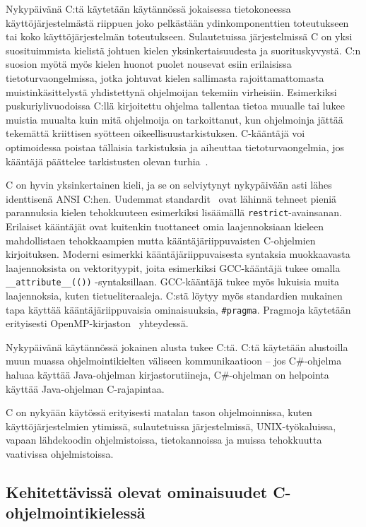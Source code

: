 \grayrule

Nykypäivänä C:tä käytetään käytännössä jokaisessa tietokoneessa
käyttöjärjestelmästä riippuen joko pelkästään ydinkomponenttien toteutukseen
tai koko käyttöjärjestelmän toteutukseen. Sulautetuissa järjestelmissä C on
yksi suosituimmista kielistä johtuen kielen yksinkertaisuudesta ja
suorituskyvystä. C:n suosion myötä myös kielen huonot puolet nousevat esiin
erilaisissa tietoturvaongelmissa, jotka johtuvat kielen sallimasta
rajoittamattomasta muistinkäsittelystä yhdistettynä ohjelmoijan tekemiin
virheisiin. Esimerkiksi puskuriylivuodoissa C:llä kirjoitettu ohjelma tallentaa
tietoa muualle tai lukee muistia muualta kuin mitä ohjelmoija on tarkoittanut,
kun ohjelmoinja jättää tekemättä kriittisen syötteen oikeellisuustarkistuksen.
C-kääntäjä voi optimoidessa poistaa tällaisia tarkistuksia ja aiheuttaa
tietoturvaongelmia, jos kääntäjä päättelee tarkistusten olevan
turhia~\citep{redhatsecurity}.

C on hyvin yksinkertainen kieli, ja se on selviytynyt nykypäivään asti lähes
identtisenä ANSI C:hen. Uudemmat standardit~\citep{C99, C11, C18} ovat lähinnä
tehneet pieniä parannuksia kielen tehokkuuteen esimerkiksi lisäämällä
\texttt{restrict}-avainsanan. Erilaiset kääntäjät ovat kuitenkin tuottaneet
omia laajennoksiaan kieleen mahdollistaen tehokkaampien mutta
kääntäjäriippuvaisten C-ohjelmien kirjoituksen. Moderni esimerkki
kääntäjäriippuvaisesta syntaksia muokkaavasta laajennoksista on vektorityypit,
joita esimerkiksi GCC-kääntäjä tukee omalla \texttt{\_\_attribute\_\_(())}
-syntaksillaan. GCC-kääntäjä tukee myös lukuisia muita laajennoksia, kuten
tietueliteraaleja. C:stä löytyy myös standardien mukainen tapa käyttää
kääntäjäriippuvaisia ominaisuuksia, \texttt{\#pragma}. Pragmoja käytetään
erityisesti OpenMP-kirjaston~\citep{openmp} yhteydessä.

Nykypäivänä käytännössä jokainen alusta tukee C:tä. C:tä käytetään alustoilla
muun muassa ohjelmointikielten väliseen kommunikaatioon -- jos C\#-ohjelma
haluaa käyttää Java-ohjelman kirjastorutiineja, C\#-ohjelman on helpointa
käyttää Java-ohjelman C-rajapintaa.

C on nykyään käytössä erityisesti matalan tason ohjelmoinnissa, kuten
käyttöjärjestelmien ytimissä, sulautetuissa järjestelmissä, UNIX-työkaluissa,
vapaan lähdekoodin ohjelmistoissa, tietokannoissa ja muissa tehokkuutta
vaativissa ohjelmistoissa.

\subsection{Kehitettävissä olevat ominaisuudet C-ohjelmointikielessä}

